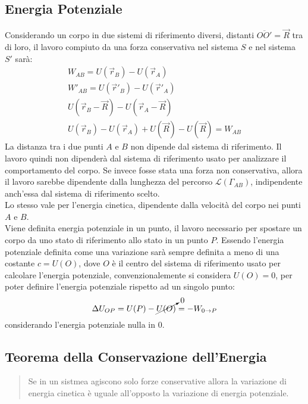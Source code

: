\documentclass{article}
\numberwithin{equation}{subsection}
\begin{document}
\subsection{Energia Potenziale}
Considerando un corpo in due sistemi di riferimento diversi, distanti 
$\overline{OO'}=\vec{R}$ tra di loro, il lavoro compiuto da una forza 
conservativa nel sistema $S$ e nel sistema $S'$ sarà:
\begin{gather}
    W_{AB}=U(\vec{r}_B)-U(\vec{r}_A)\\
    W'_{AB}=U(\vec{r}'_B)-U(\vec{r}'_A)\\
    U(\vec{r}_B-\vec{R})-U(\vec{r}_A-\vec{R})\\
    U(\vec{r}_B)-U(\vec{r}_A)+U(\vec{R})-U(\vec{R})=W_{AB}
\end{gather}
La  distanza tra i due punti $A$ e $B$ non dipende dal sistema di 
riferimento. 
Il lavoro quindi non dipenderà dal sistema di riferimento usato per 
analizzare il comportamento del corpo. 
Se invece fosse stata una forza non conservativa, allora il 
lavoro sarebbe dipendente dalla lunghezza del percorso $\mathscr{L} (\Gamma_{AB})$, 
indipendente anch'essa dal sistema di riferimento scelto.\\
Lo stesso vale per l'energia cinetica, dipendente dalla velocità 
del corpo nei punti $A$ e $B$.\\
Viene definita energia potenziale in un punto, il lavoro necessario per spostare un corpo da uno stato di riferimento allo stato in un punto $P$. Essendo l'energia potenziale 
definita come una variazione sarà sempre definita a meno di una costante $c=U(O)$, dove $O$ è il centro del sistema di riferimento usato per calcolare l'energia potenziale, 
convenzionalemente si considera $U(O)=0$, per poter definire l'energia potenziale rispetto ad un singolo punto: 
\begin{equation}
    \Delta U_{OP}=U(P)-\cancelto{0}{U(O)}=-W_{0\to P}
\end{equation}
considerando l'energia potenziale nulla in $0$. 

\subsection{Teorema della Conservazione dell'Energia}
\begin{quotation}
    Se in un sistmea agiscono solo forze conservative allora la variazione di energia cinetica è uguale all'opposto la variazione di energia potenziale.
\end{quotation}
\end{document}
